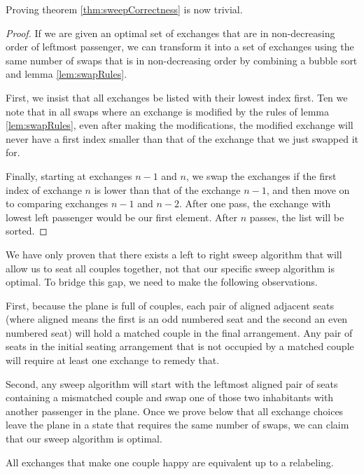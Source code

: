 Proving theorem \ref{thm:sweepCorrectness} is now trivial.

\begin{proof}
If we are given an optimal set of exchanges that are in non-decreasing order of leftmost passenger, we can transform it into a set of exchanges using the same number of swaps that is in non-decreasing order by combining a bubble sort and lemma \ref{lem:swapRules}.

First, we insist that all exchanges be listed with their lowest index first.  Ten we note that in all swaps where an exchange is modified by the rules of lemma \ref{lem:swapRules}, even after making the modifications, the modified exchange will never have a first index smaller than that of the exchange that we just swapped it for.

Finally, starting at exchanges $n-1$ and $n$, we swap the exchanges if the first index of exchange $n$ is lower than that of the exchange $n-1$, and then move on to comparing exchanges $n-1$ and $n-2$.  After one pass, the exchange with lowest left passenger would be our first element. After $n$ passes, the list will be sorted.
\end{proof}

We have only proven that there exists a left to right sweep algorithm that will allow us to seat all couples together, not that our specific sweep algorithm is optimal.  To bridge this gap, we need to make the following observations.

First, because the plane is full of couples, each pair of aligned adjacent seats (where aligned means the first is an odd numbered seat and the second an even numbered seat) will hold a matched couple in the final arrangement.  Any pair of seats in the initial seating arrangement that is not occupied by a matched couple will require at least one exchange to remedy that.

Second, any sweep algorithm will start with the leftmost aligned pair of seats containing a mismatched couple and swap one of those two inhabitants with another passenger in the plane.  Once we prove below that all exchange choices leave the plane in a state that requires the same number of swaps, we can claim that our sweep algorithm is optimal.

\begin{lem} \label{lem:identicalToRelabel}
All exchanges that make one couple happy are equivalent up to a relabeling.
\end{lem}

